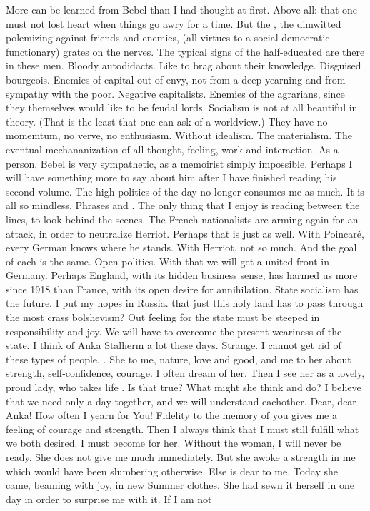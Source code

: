 
More can be learned from Bebel than I had thought at first. Above all: that one must not lost heart when things go awry for a time. But the , the dimwitted polemizing against friends and enemies,  (all virtues to a social-democratic functionary) grates on the nerves. The typical signs of the half-educated are there in these men. Bloody autodidacts. Like to brag about their  knowledge. Disguised bourgeois. Enemies of capital out of envy, not from a deep yearning and from sympathy with the poor. Negative capitalists. Enemies of the agrarians, since they themselves would like to be feudal lords. Socialism is not at all beautiful in theory. (That is the least that one can ask of a worldview.) They have no momemtum, no verve, no enthusiasm. Without idealism. The  materialism. The eventual mechananization of all thought, feeling, work and interaction. As a person, Bebel is very sympathetic, as a memoirist simply impossible. Perhaps I will have something more to say about him after I have finished reading his second volume. The high politics of the day no longer consumes me as much. It is all so mindless. Phrases and . The only thing that I enjoy is reading between the lines, to look behind the scenes. The French nationalists are arming again for an attack, in order to neutralize Herriot. Perhaps that is just as well. With Poincaré, every German knows where he stands. With Herriot, not so much. And the goal of each is the same. Open politics. With that we will get a united front in Germany. Perhaps England, with its hidden business sense, has harmed us more since 1918 than France, with its open desire for annihilation. State socialism has the future. I put my hopes in Russia.  that just this holy land has to pass through the most crass bolshevism? Out feeling for the state must be steeped in responsibility and joy. We will have to overcome the present weariness of the state. I think of Anka Stalherm a lot these days. Strange. I cannot get rid of these types of people. . She to me,  nature, love and good, and me to her about strength, self-confidence, courage. I often dream of her. Then I see her as a lovely, proud lady, who takes life . Is that true? What might she think and do? I believe that we need only a day together, and we will understand eachother. Dear, dear Anka! How often I yearn for You! Fidelity to the memory of you gives me a feeling of courage and strength. Then I always think that I must still fulfill what we both desired. I must become  for her. Without the woman, I will never be ready. She does not give me much immediately. But she awoke a strength in me which would have been slumbering otherwise. Else is dear to me. Today she came, beaming with joy, in new Summer clothes. She had sewn it herself in one day in order to surprise me with it. If I am not 